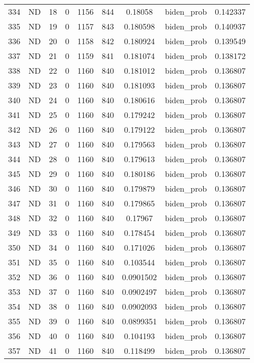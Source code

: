 \documentclass[12pt,a4paper]{article}
\begin{document}
\begin{tabular}{r|cccccccc}
	334 & ND & 18 & 0 & 1156 & 844 & 0.18058 & biden\_prob & 0.142337 \\
	335 & ND & 19 & 0 & 1157 & 843 & 0.180598 & biden\_prob & 0.140937 \\
	336 & ND & 20 & 0 & 1158 & 842 & 0.180924 & biden\_prob & 0.139549 \\
	337 & ND & 21 & 0 & 1159 & 841 & 0.181074 & biden\_prob & 0.138172 \\
	338 & ND & 22 & 0 & 1160 & 840 & 0.181012 & biden\_prob & 0.136807 \\
	339 & ND & 23 & 0 & 1160 & 840 & 0.181093 & biden\_prob & 0.136807 \\
	340 & ND & 24 & 0 & 1160 & 840 & 0.180616 & biden\_prob & 0.136807 \\
	341 & ND & 25 & 0 & 1160 & 840 & 0.179242 & biden\_prob & 0.136807 \\
	342 & ND & 26 & 0 & 1160 & 840 & 0.179122 & biden\_prob & 0.136807 \\
	343 & ND & 27 & 0 & 1160 & 840 & 0.179563 & biden\_prob & 0.136807 \\
	344 & ND & 28 & 0 & 1160 & 840 & 0.179613 & biden\_prob & 0.136807 \\
	345 & ND & 29 & 0 & 1160 & 840 & 0.180186 & biden\_prob & 0.136807 \\
	346 & ND & 30 & 0 & 1160 & 840 & 0.179879 & biden\_prob & 0.136807 \\
	347 & ND & 31 & 0 & 1160 & 840 & 0.179865 & biden\_prob & 0.136807 \\
	348 & ND & 32 & 0 & 1160 & 840 & 0.17967 & biden\_prob & 0.136807 \\
	349 & ND & 33 & 0 & 1160 & 840 & 0.178454 & biden\_prob & 0.136807 \\
	350 & ND & 34 & 0 & 1160 & 840 & 0.171026 & biden\_prob & 0.136807 \\
	351 & ND & 35 & 0 & 1160 & 840 & 0.103544 & biden\_prob & 0.136807 \\
	352 & ND & 36 & 0 & 1160 & 840 & 0.0901502 & biden\_prob & 0.136807 \\
	353 & ND & 37 & 0 & 1160 & 840 & 0.0902497 & biden\_prob & 0.136807 \\
	354 & ND & 38 & 0 & 1160 & 840 & 0.0902093 & biden\_prob & 0.136807 \\
	355 & ND & 39 & 0 & 1160 & 840 & 0.0899351 & biden\_prob & 0.136807 \\
	356 & ND & 40 & 0 & 1160 & 840 & 0.104193 & biden\_prob & 0.136807 \\
	357 & ND & 41 & 0 & 1160 & 840 & 0.118499 & biden\_prob & 0.136807 \\

\end{tabular}
\end{document}
